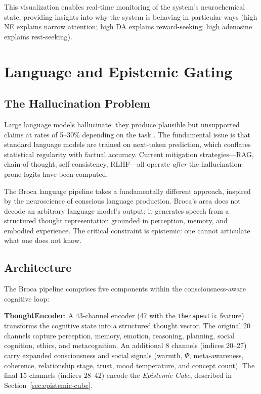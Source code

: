 \documentclass[12pt]{book}
\begin{document}
This visualization enables real-time monitoring of the system's neurochemical state, providing insights into why the system is behaving in particular ways (high NE explains narrow attention; high DA explains reward-seeking; high adenosine explains rest-seeking).


\chapter{Language and Epistemic Gating}
\label{ch:broca}

\section{The Hallucination Problem}

Large language models hallucinate: they produce plausible but unsupported claims at rates of 5--30\% depending on the task \citep{ji2023survey}. The fundamental issue is that standard language models are trained on next-token prediction, which conflates statistical regularity with factual accuracy. Current mitigation strategies---RAG, chain-of-thought, self-consistency, RLHF---all operate \textit{after} the hallucination-prone logits have been computed.

The Broca language pipeline takes a fundamentally different approach, inspired by the neuroscience of conscious language production. Broca's area does not decode an arbitrary language model's output; it generates speech from a structured thought representation grounded in perception, memory, and embodied experience. The critical constraint is epistemic: one cannot articulate what one does not know.

\section{Architecture}

The Broca pipeline comprises five components within the consciousness-aware cognitive loop:

\textbf{ThoughtEncoder}: A 43-channel encoder (47 with the \texttt{therapeutic} feature) transforms the cognitive state into a structured thought vector. The original 20 channels capture perception, memory, emotion, reasoning, planning, social cognition, ethics, and metacognition. An additional 8 channels (indices 20--27) carry expanded consciousness and social signals (warmth, $\Psi$, meta-awareness, coherence, relationship stage, trust, mood temperature, and concept count). The final 15 channels (indices 28--42) encode the \textit{Epistemic Cube}, described in Section~\ref{sec:epistemic-cube}.
\end{document}
